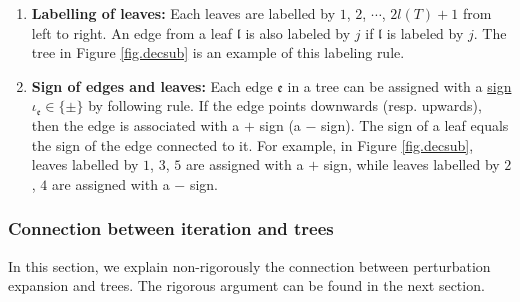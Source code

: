 \begin{defn}
\begin{enumerate}
 \item \textbf{Labelling of leaves:} Each leaves are labelled by $1$, $2$, $\cdots$, $2l(T)+1$ from left to right. An edge from a leaf $\mathfrak{l}$ is also labeled by $j$ if $\mathfrak{l}$ is labeled by $j$. The tree in Figure \ref{fig.decsub} is an example of this labeling rule.


 \item \textbf{Sign of edges and leaves:} Each edge $\mathfrak{e}$ in a tree can be assigned with a \underline{sign} $\iota_{\mathfrak{e}}\in\{\pm\}$ by following rule. If the edge points downwards (resp. upwards), then the edge is associated with a $+$ sign (a $-$ sign). The sign of a leaf equals the sign of the edge connected to it. For example, in Figure \ref{fig.decsub}, leaves labelled by $1$, $3$, $5$ are assigned with a $+$ sign, while leaves labelled by $2$, $4$ are assigned with a $-$ sign.
 

\end{enumerate}

 


\end{defn}





\subsubsection{Connection between iteration and trees}\label{sec.connection} In this section, we explain non-rigorously the connection between perturbation expansion and trees. The rigorous argument can be found in the next section. 

